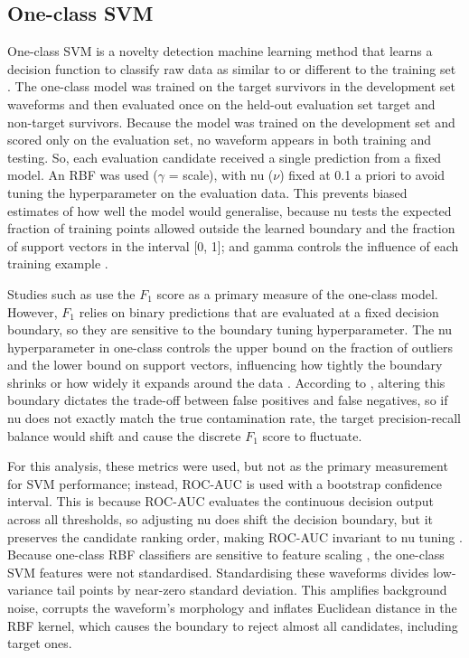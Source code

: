 \documentclass[ %
                    author={Rzan Alkabier},
                    supervisor={Dr. Zahraa Abdallah},
                    degree={MSc},
                     title={Denoising Extracellular Recording for Spike Detection and Classification on Single Channels},
                    subtitle={Does denoising improve detection and classification performance?},
                      type={},
                      year={2026}]{dissertation}
\begin{document}
\subsection{One-class SVM}
One-class SVM is a novelty detection machine learning method that learns a decision function to classify raw data as similar to or different to the training set \cite{yang_efficient_2021}. The one-class model was trained on the target survivors in the development set waveforms and then evaluated once on the held-out evaluation set target and non-target survivors. Because the model was trained on the development set and scored only on the evaluation set, no waveform appears in both training and testing. So, each evaluation candidate received a single prediction from a fixed model. An RBF was used ($\gamma$ = scale), with nu ($\nu$) fixed at 0.1 a priori to avoid tuning the hyperparameter on the evaluation data. This prevents biased estimates of how well the model would generalise, because nu tests the expected fraction of training points allowed outside the learned boundary and the fraction of support vectors in the interval [0, 1]; and gamma controls the influence of each training example \cite{moctezuma_multi-objective_2020}. 
\bigskip

\noindent
Studies such as \cite{troglio_hybrid_2026} use the $F_1$ score as a primary measure of the one-class model. However, $F_1$ relies on binary predictions that are evaluated at a fixed decision boundary, so they are sensitive to the boundary tuning hyperparameter. The nu hyperparameter in one-class controls the upper bound on the fraction of outliers and the lower bound on support vectors, influencing how tightly the boundary shrinks or how widely it expands around the data \cite{scholkopf_estimating_2001}. According to \cite{tax_support_2004}, altering this boundary dictates the trade-off between false positives and false negatives, so if nu does not exactly match the true contamination rate, the target precision-recall balance would shift and cause the discrete $F_1$ score to fluctuate. 
\bigskip

\noindent
For this analysis, these metrics were used, but not as the primary measurement for SVM performance; instead, ROC-AUC is used with a bootstrap confidence interval. This is because ROC-AUC evaluates the continuous decision output across all thresholds, so adjusting nu does shift the decision boundary, but it preserves the candidate ranking order, making ROC-AUC invariant to nu tuning \cite{tax_support_2004, abdelhamid_balancing_2024}. 
Because one-class RBF classifiers are sensitive to feature scaling \cite{juszczak_feature_2002, feragen_adaptive_2015}, the one-class SVM features were not standardised. Standardising these waveforms divides low-variance tail points by near-zero standard deviation. This amplifies background noise, corrupts the waveform's morphology and inflates Euclidean distance in the RBF kernel, which causes the boundary to reject almost all candidates, including target ones. 
\end{document}
